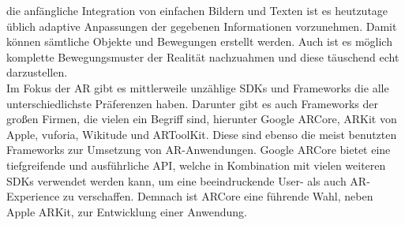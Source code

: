 die anfängliche Integration von einfachen Bildern und Texten ist es heutzutage üblich adaptive Anpassungen der gegebenen Informationen 
vorzunehmen. \cite{standDerAR.2020} Damit können sämtliche Objekte und Bewegungen erstellt werden. Auch ist es möglich komplette Bewegungsmuster der Realität 
nachzuahmen und diese täuschend echt darzustellen.
\\ 
\linebreak
Im Fokus der \acl{AR} gibt es mittlerweile unzählige SDKs und Frameworks die alle unterschiedlichste Präferenzen haben. Darunter gibt es 
auch Frameworks der großen Firmen, die vielen ein Begriff sind, hierunter Google ARCore, ARKit von Apple, vuforia, Wikitude und ARToolKit. 
Diese sind ebenso die meist benutzten Frameworks zur Umsetzung von \acs{AR}-Anwendungen. Google ARCore bietet eine tiefgreifende und ausführliche 
\ac{API}, welche in Kombination mit vielen weiteren SDKs verwendet werden kann, um eine beeindruckende User- als auch \acs{AR}-Experience zu verschaffen. 
Demnach ist ARCore eine führende Wahl, neben Apple ARKit, zur Entwicklung einer Anwendung. 
